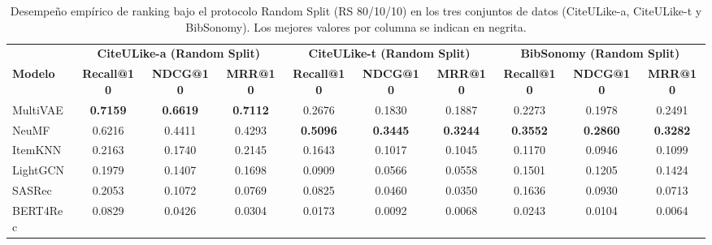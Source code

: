 \documentclass[journal]{IEEEtran}
\makeatletter
\newcommand{\at}[1]{@#1}
\makeatother
\begin{document}
\begin{table}[t]
\centering
\caption{Desempeño empírico de ranking bajo el protocolo Random Split (RS 80/10/10) en los tres conjuntos de datos (CiteULike-a, CiteULike-t y BibSonomy). Los mejores valores por columna se indican en negrita.}
\label{tab:results-rs}
\footnotesize
\setlength{\tabcolsep}{3.5pt}
\begin{tabular}{lccccccccc}
\toprule
& \multicolumn{3}{c}{\textbf{CiteULike-a (Random Split)}} & \multicolumn{3}{c}{\textbf{CiteULike-t (Random Split)}} & \multicolumn{3}{c}{\textbf{BibSonomy (Random Split)}} \\
\cmidrule(lr){2-4} \cmidrule(lr){5-7} \cmidrule(lr){8-10}
\textbf{Modelo} & \textbf{Recall\at{10}} & \textbf{NDCG\at{10}} & \textbf{MRR\at{10}} & \textbf{Recall\at{10}} & \textbf{NDCG\at{10}} & \textbf{MRR\at{10}} & \textbf{Recall\at{10}} & \textbf{NDCG\at{10}} & \textbf{MRR\at{10}} \\
\midrule
MultiVAE & \textbf{0.7159} & \textbf{0.6619} & \textbf{0.7112} & 0.2676 & 0.1830 & 0.1887 & 0.2273 & 0.1978 & 0.2491 \\
NeuMF    & 0.6216 & 0.4411 & 0.4293 & \textbf{0.5096} & \textbf{0.3445} & \textbf{0.3244} & \textbf{0.3552} & \textbf{0.2860} & \textbf{0.3282} \\
ItemKNN  & 0.2163 & 0.1740 & 0.2145 & 0.1643 & 0.1017 & 0.1045 & 0.1170 & 0.0946 & 0.1099 \\
LightGCN & 0.1979 & 0.1407 & 0.1698 & 0.0909 & 0.0566 & 0.0558 & 0.1501 & 0.1205 & 0.1424 \\
SASRec   & 0.2053 & 0.1072 & 0.0769 & 0.0825 & 0.0460 & 0.0350 & 0.1636 & 0.0930 & 0.0713 \\
BERT4Rec & 0.0829 & 0.0426 & 0.0304 & 0.0173 & 0.0092 & 0.0068 & 0.0243 & 0.0104 & 0.0064 \\
\bottomrule
\end{tabular}
\end{table}
\end{document}
